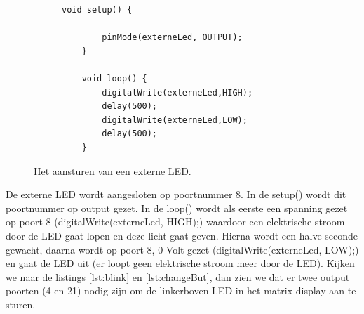 \begin{figure}[h!]
\begin{center}
\begin{subfigure}[b]{0.46\textwidth}
\begin{lstlisting}[caption={Het aansturen van een externe LED.},label={lst:extLd}]
   void setup() {

		pinMode(externeLed, OUTPUT);  
	}
				
	void loop() {
		digitalWrite(externeLed,HIGH);
		delay(500);
		digitalWrite(externeLed,LOW);
		delay(500); 
	}
\end{lstlisting}
		\end{subfigure}
		\captionsetup{justification=centering}
		\caption{Het aansturen van een externe LED. }
		\label{fig:exampleInh}
	\end{center}	
\end{figure}
De externe LED wordt aangesloten op poortnummer 8. In de \textcolor{arduinoGreen}{setup}() wordt dit poortnummer op output gezet. 
In de \textcolor{arduinoGreen}{loop}() wordt als eerste een spanning gezet op poort 8 (\textcolor{arduinoOrange}{digitalWrite}(externeLed, \textcolor{arduinoBlue}{HIGH});) waardoor een elektrische stroom door de LED gaat lopen en deze licht gaat geven. 
Hierna wordt een halve seconde gewacht, daarna wordt op poort 8,  0 Volt gezet (\textcolor{arduinoOrange}{digitalWrite}(externeLed, \textcolor{arduinoBlue}{LOW});) en gaat de LED uit (er loopt geen elektrische stroom meer door de LED).
Kijken we naar de listings \ref{lst:blink} en \ref{lst:changeBut}, dan zien we dat er twee output poorten (4 en 21) nodig zijn om de linkerboven LED in het matrix display aan te sturen. 

